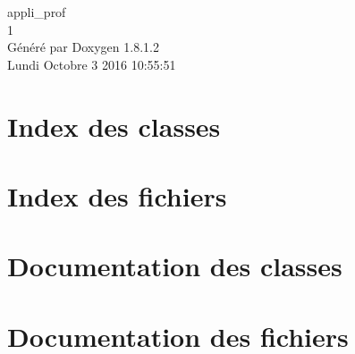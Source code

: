 \documentclass{book}
\begin{document}
\hypersetup{pageanchor=false,citecolor=blue}
\begin{titlepage}
\vspace*{7cm}
\begin{center}
{\Large appli\-\_\-prof \\[1ex]\large 1 }\\
\vspace*{1cm}
{\large Généré par Doxygen 1.8.1.2}\\
\vspace*{0.5cm}
{\small Lundi Octobre 3 2016 10:55:51}\\
\end{center}
\end{titlepage}
\clearemptydoublepage
{}
\tableofcontents
\clearemptydoublepage
{}
\hypersetup{pageanchor=true,citecolor=blue}
\chapter{Index des classes}

\chapter{Index des fichiers}

\chapter{Documentation des classes}





\chapter{Documentation des fichiers}











\printindex
\end{document}

